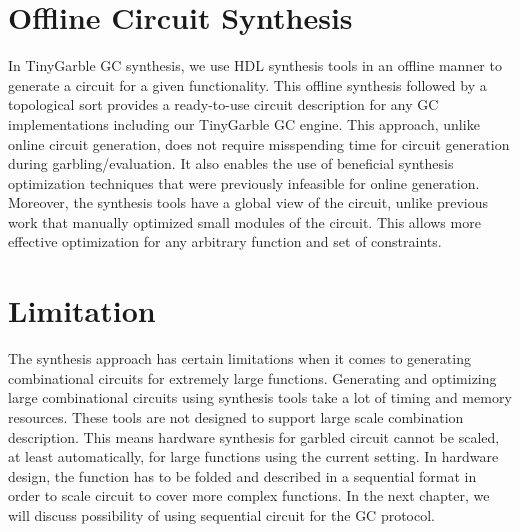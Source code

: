 \section{Offline Circuit Synthesis}
In TinyGarble GC synthesis, we use HDL synthesis tools in an offline manner to generate a circuit for a given functionality.
This offline synthesis followed by a topological sort provides a ready-to-use circuit description for any GC implementations including our TinyGarble GC engine.
This approach, unlike online circuit generation, does not require misspending time for circuit generation during garbling/evaluation.
It also enables the use of beneficial synthesis optimization techniques that were previously infeasible for online generation.
Moreover, the synthesis tools have a global view of the circuit, unlike previous work that manually optimized small modules of the circuit.
This allows more effective optimization for any arbitrary function and set of constraints.

\section{Limitation}
The synthesis approach has certain limitations when it comes to generating combinational circuits for extremely large functions.
Generating and optimizing large combinational circuits using synthesis tools take a lot of timing and memory resources.
These tools are not designed to support large scale combination description.
This means hardware synthesis for garbled circuit cannot be scaled, at least automatically, for large functions using the current setting.
In hardware design, the function has to be folded and described in a sequential format in order to scale circuit to cover more complex functions.
In the next chapter, we will discuss possibility of using sequential circuit for the GC protocol.
